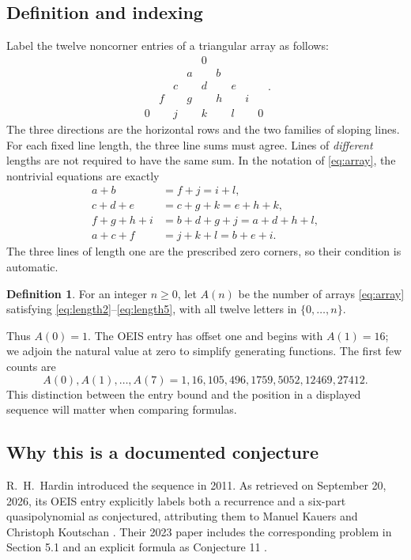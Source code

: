 \documentclass[11pt]{article}
\numberwithin{equation}{section}
\theoremstyle{definition}
\newtheorem{definition}[theorem]{Definition}
\begin{document}
\subsection{Definition and indexing}
Label the twelve noncorner entries of a triangular array as follows:
\begin{equation}\label{eq:array}
\begin{array}{ccccccccc}
&&&&0&&&&\\
&&&a&&b&&&\\
&&c&&d&&e&&\\
&f&&g&&h&&i&\\
0&&j&&k&&l&&0
\end{array}.
\end{equation}
The three directions are the horizontal rows and the two families of sloping
lines. For each fixed line length, the three line sums must agree. Lines of
\emph{different} lengths are not required to have the same sum. In the notation
of \eqref{eq:array}, the nontrivial equations are exactly
\begin{align}
a+b&=f+j=i+l,\label{eq:length2}\\
c+d+e&=c+g+k=e+h+k,\label{eq:length3}\\
f+g+h+i&=b+d+g+j=a+d+h+l,\label{eq:length4}\\
a+c+f&=j+k+l=b+e+i.\label{eq:length5}
\end{align}
The three lines of length one are the prescribed zero corners, so their
condition is automatic.

\begin{definition}
For an integer $n\geq0$, let $A(n)$ be the number of arrays
\eqref{eq:array} satisfying \eqref{eq:length2}--\eqref{eq:length5}, with all
twelve letters in $\{0,\ldots,n\}$.
\end{definition}

Thus $A(0)=1$. The OEIS entry has offset one and begins with $A(1)=16$;
we adjoin the natural value at zero to simplify generating functions.
The first few counts are
\[
A(0),A(1),\ldots,A(7)=1,16,105,496,1759,5052,12469,27412.
\]
This distinction between the entry bound and the position in a displayed
sequence will matter when comparing formulas.

\subsection{Why this is a documented conjecture}
R.\ H.\ Hardin introduced the sequence in 2011. As retrieved on September 20,
2026, its OEIS entry explicitly labels both a recurrence and a six-part
quasipolynomial as conjectured, attributing them to Manuel Kauers and
Christoph Koutschan \cite{oeis}. Their 2023 paper includes the corresponding
problem in Section 5.1 and an explicit formula as Conjecture 11
\cite[pp.~24--25]{kk}.
\end{document}
